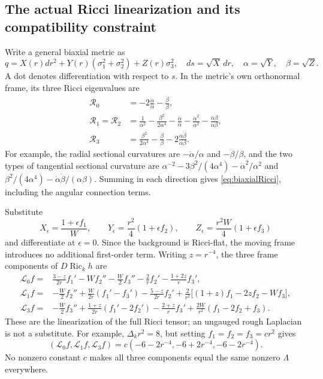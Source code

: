 \documentclass[a4paper,11pt]{article}
\numberwithin{equation}{section}
\theoremstyle{definition}
\newcommand{\Ric}{\operatorname{Ric}}
\begin{document}
\subsection{The actual Ricci linearization and its compatibility constraint}
Write a general biaxial metric as
\[
q=X(r)dr^2+Y(r)(\sigma_1^2+\sigma_2^2)+Z(r)\sigma_3^2,
\quad ds=\sqrt X\,dr,\quad \alpha=\sqrt Y,\quad\beta=\sqrt Z.
\]
A dot denotes differentiation with respect to $s$. In the metric's own orthonormal frame, its three Ricci eigenvalues are
\begin{align}
\mathscr R_0&=-2\frac{\ddot\alpha}{\alpha}-\frac{\ddot\beta}{\beta},\nonumber\\
\mathscr R_1=\mathscr R_2
&=\frac1{\alpha^2}-\frac{\beta^2}{2\alpha^4}
-\frac{\ddot\alpha}{\alpha}-\frac{\dot\alpha^2}{\alpha^2}
-\frac{\dot\alpha\dot\beta}{\alpha\beta},\label{eq:biaxialRicci}\\
\mathscr R_3&=\frac{\beta^2}{2\alpha^4}
-\frac{\ddot\beta}{\beta}-2\frac{\dot\alpha\dot\beta}{\alpha\beta}.
\nonumber
\end{align}
For example, the radial sectional curvatures are $-\ddot\alpha/\alpha$ and $-\ddot\beta/\beta$,
and the two types of tangential sectional curvature are
$\alpha^{-2}-3\beta^2/(4\alpha^4)-\dot\alpha^2/\alpha^2$ and
$\beta^2/(4\alpha^4)-\dot\alpha\dot\beta/(\alpha\beta)$.
Summing in each direction gives \eqref{eq:biaxialRicci}, including the angular connection terms.

Substitute
\[
X_\epsilon=\frac{1+\epsilon f_1}{W},\qquad
Y_\epsilon=\frac{r^2}{4}(1+\epsilon f_2),\qquad
Z_\epsilon=\frac{r^2W}{4}(1+\epsilon f_3)
\]
and differentiate at $\epsilon=0$. Since the background is Ricci-flat, the moving frame introduces no additional first-order term.
Writing $z=r^{-4}$, the three frame components of $D\Ric_kh$ are
\begin{align}
\mathscr L_0f={}&\frac{3-z}{2r}f_1'-Wf_2''-\frac W2f_3''
-\frac2r f_2'-\frac{1+2z}{r}f_3',\nonumber\\
\mathscr L_1f={}&-\frac W2f_2''+\frac W{2r}(f_1'-f_3')
-\frac{5-z}{2r}f_2'
+\frac2{r^2}\bigl[(1+z)f_1-2zf_2-Wf_3\bigr],\label{eq:eh-radial-linear}\\
\mathscr L_3f={}&-\frac W2f_3''+\frac{1+z}{2r}(f_1'-2f_2')
-\frac{2+z}{r}f_3'+\frac{2W}{r^2}(f_1-2f_2+f_3).
\nonumber
\end{align}
These are the linearization of the full Ricci tensor; an ungauged rough Laplacian is not a substitute.
For example, $\Delta_kr^2=8$, but setting $f_1=f_2=f_3=cr^2$ gives
\[
(\mathscr L_0f,\mathscr L_1f,\mathscr L_3f)
=c(-6-2r^{-4},-6+2r^{-4},-6-2r^{-4}).
\]
No nonzero constant $c$ makes all three components equal the same nonzero $\Lambda$ everywhere.
\end{document}
